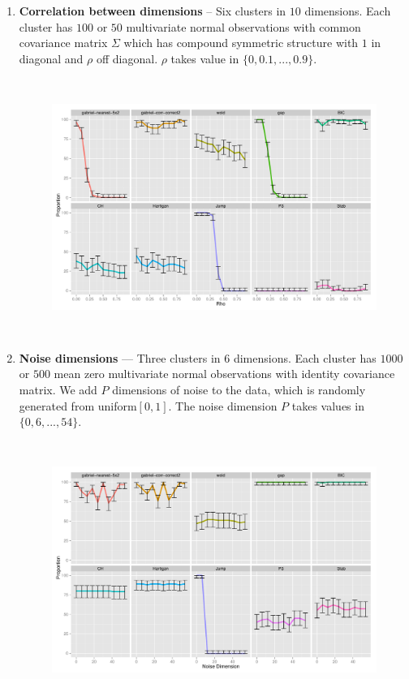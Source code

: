 \documentclass[12pt]{article}
\begin{document}
\begin{enumerate}

  \item \textbf{Correlation between dimensions} -- Six clusters in $10$ dimensions. 
  	Each cluster has $100$ or $50$
    multivariate normal observations with common covariance matrix $\Sigma$ 
    which has compound symmetric structure with $1$ in diagonal and $\rho$ 
    off diagonal. $\rho$ takes value in $\{0,0.1,...,0.9\}$.
	
	\begin{figure}[H]
	\centering
	\includegraphics[width=5.5in, height=3.3in]{demo/bench/setting1/Facet.pdf}
	\label{fig:setting1}
	\end{figure}
	
  \item \textbf{Noise dimensions} --- Three clusters in $6$ dimensions. Each cluster has $1000$ or $500$
    mean zero multivariate normal observations with identity covariance matrix. 
    We add $P$ dimensions of noise to the data, which is randomly generated from uniform$[0,1]$. The noise
    dimension $P$ takes values in $\{0,6,...,54\}$. 
	
	\begin{figure}[H]
	\centering
	\includegraphics[width=5.5in, height=3.3in]{demo/bench/setting2/Facet.pdf}
	\label{fig:setting2}
	\end{figure}
	

\end{enumerate}
\end{document}
